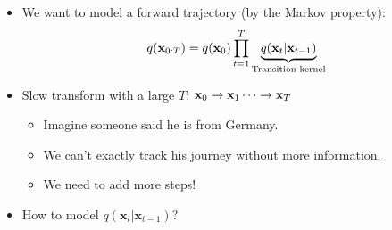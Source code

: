 	\begin{itemize}
		\item We want to model a forward trajectory (by the Markov property): 
			$$q(\mathbf{x}_{0:T}) = q({\mathbf{x}}_0)\prod^T_{t=1} \underbrace{q(\mathbf{x}_t \vert \mathbf{x}_{t-1})}_{\text{Transition kernel}} $$
		\item Slow transform with a large $T$: ${\mathbf{x}}_0\to {\mathbf{x}}_1\cdots\to {\mathbf{x}}_T$
			\begin{itemize}
				\item Imagine someone said he is from Germany.
				\item We can't exactly track his journey without more information.
				\item We need to add more steps!
			\end{itemize}
		\item How to model $q(\mathbf{x}_t \vert \mathbf{x}_{t-1})$?
	\end{itemize}

